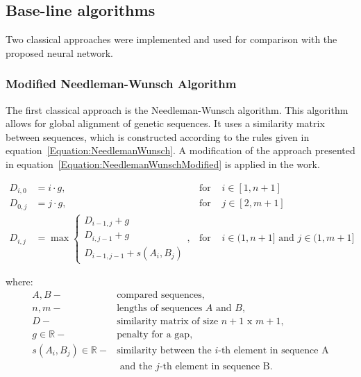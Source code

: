 \documentclass[pdflatex,sn-vancouver-num]{sn-jnl}%
\begin{document}
        \subsection{Base-line algorithms}


            Two classical approaches were implemented and used for comparison with the proposed neural network.

            \subsubsection{Modified Needleman-Wunsch Algorithm}
                The first classical approach is the Needleman-Wunsch algorithm. This algorithm allows for global alignment of genetic sequences. It uses a similarity matrix between sequences, which is constructed according to the rules given in equation~\eqref{Equation:NeedlemanWunsch}. A modification of the approach presented in equation~\eqref{Equation:NeedlemanWunschModified} is applied in the work.

                \begin{equation}
                    \begin{aligned}
                        D_{i,0} &= i \cdot g, & \text{for } & i \in [1, n + 1] \\
                        D_{0,j} &= j \cdot g, & \text{for } & j \in [2, m + 1] \\
                        D_{i,j} &= \max
                        \begin{cases}
                            D_{i - 1, j} + g \\
                            D_{i, j - 1} + g \\
                            D_{i - 1, j - 1} + s(A_i, B_j)
                        \end{cases}, & \text{for } & i \in (1, n + 1] \text{ and } j \in (1, m + 1]
                    \end{aligned}
                    \label{Equation:NeedlemanWunsch}
                \end{equation}

                where:
                \begin{align*}
                    A, B -& \text{compared sequences}, \\
                    n, m -& \text{lengths of sequences } A \text{ and } B, \\
                    D -& \text{similarity matrix of size } n + 1 \text{ x } m + 1, \\
                    g \in \mathbb{R} -& \text{penalty for a gap}, \\
                    s(A_i, B_j) \in \mathbb{R} -& \text{similarity between the } i\text{-th element in sequence A} \\
                                                & \text{ and the } j\text{-th element in sequence B}.
                \end{align*}
\end{document}
